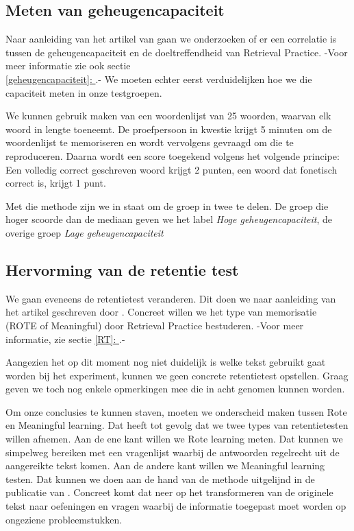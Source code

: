 \documentclass{hogent-article}
\newcommand{\customref}[1]{\underline{\ref{#1}: \nameref{#1}}}
\begin{document}
\subsection{Meten van geheugencapaciteit}
\label{methodology-gc}
Naar aanleiding van het artikel van \textcite{Agarwal_2016} gaan we onderzoeken of er een correlatie is tussen de geheugencapaciteit en de doeltreffendheid van Retrieval Practice. -Voor meer informatie zie ook sectie \\\customref{geheugencapaciteit}.- We moeten echter eerst verduidelijken hoe we die capaciteit meten in onze testgroepen.\\
\par
\noindent
We kunnen gebruik maken van een woordenlijst van 25 woorden, waarvan elk woord in lengte toeneemt. De proefpersoon in kwestie krijgt 5 minuten om de woordenlijst te memoriseren en wordt vervolgens gevraagd om die te reproduceren. Daarna wordt een score toegekend volgens het volgende principe: Een volledig correct geschreven woord krijgt 2 punten, een woord dat fonetisch correct is, krijgt 1 punt.\\
\par
\noindent
Met die methode zijn we in staat om de groep in twee te delen. De groep die hoger scoorde dan de mediaan geven we het label \textit{Hoge geheugencapaciteit}, de overige groep  \textit{Lage geheugencapaciteit}

\subsection{Hervorming van de retentie test}
We gaan eveneens de retentietest veranderen. Dit doen we naar aanleiding van het artikel geschreven door \textcite{van_Gog_2012}. Concreet willen we het type van memorisatie (ROTE of Meaningful) door Retrieval Practice bestuderen. -Voor meer informatie, zie sectie \customref{RT}.-\\
\par
\noindent
Aangezien het op dit moment nog niet duidelijk is welke tekst gebruikt gaat worden bij het experiment, kunnen we geen concrete retentietest opstellen. Graag geven we toch nog enkele opmerkingen mee die in acht genomen kunnen worden.\\
\par
\noindent
Om onze conclusies te kunnen staven, moeten we onderscheid maken tussen Rote en Meaningful learning. Dat heeft tot gevolg dat we twee types van retentietesten willen afnemen. Aan de ene kant willen we Rote learning meten. Dat kunnen we simpelweg bereiken met een vragenlijst waarbij de antwoorden regelrecht uit de aangereikte tekst komen. Aan de andere kant willen we Meaningful learning testen. Dat kunnen we doen aan de hand van de methode uitgelijnd in de publicatie van \textcite{Mayer_2002}. Concreet komt dat neer op het transformeren van de originele tekst naar oefeningen en vragen waarbij de informatie toegepast moet worden op ongeziene probleemstukken.
\newpage
\end{document}
